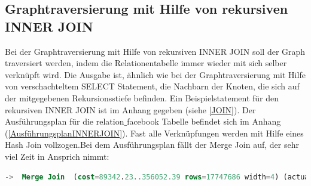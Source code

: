 \subsection{Graphtraversierung mit Hilfe von rekursiven INNER JOIN}
\label{postgresInnerJoin}
Bei der Graphtraversierung mit Hilfe von rekursiven INNER JOIN soll der Graph traversiert werden, indem die Relationentabelle immer wieder mit sich selber verknüpft wird.
Die Ausgabe ist, ähnlich wie bei der Graphtraversierung mit Hilfe von verschachteltem SELECT Statement, die Nachbarn der Knoten, die sich auf der mitgegebenen Rekursionsstiefe
befinden. Ein Beispielstatement für den rekursiven INNER JOIN ist im Anhang gegeben (siehe \ref{JOIN}). Der Ausführungsplan für die relation$\_$facebook Tabelle befindet sich
im Anhang (\ref{AusführungsplanINNERJOIN}). Fast alle Verknüpfungen werden mit Hilfe eines Hash Join vollzogen.Bei dem Ausführungsplan fällt der Merge Join auf, der sehr viel Zeit in Ansprich nimmt:
\begin{lstlisting}[language=SQL,caption = Merge JOIN,frame=single, label={mergeJoin} ]
    ->  Merge Join  (cost=89342.23..356052.39 rows=17747686 width=4) (actual time=112.509..1178.121 rows=8863706 loops=1)
\end{lstlisting}

